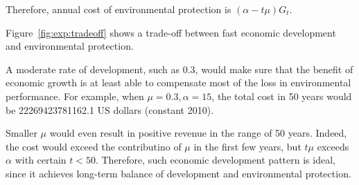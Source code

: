 Therefore, annual cost of environmental protection is $(\alpha-t\mu)G_t$.

Figure~\ref{fig:exp:tradeoff} shows a trade-off between fast economic development and environmental protection. 

A moderate rate of development, such as 0.3, would make sure that the benefit of economic growth is at least able to compensate most of the loss in environmental performance. For example, when $\mu=0.3, \alpha=15$, the total cost in 50 years would be 22269423781162.1 US dollars (constant 2010). 

Smaller $\mu$ would even result in positive revenue in the range of 50 years. Indeed, the cost would exceed the contributino of $\mu$ in the first few years, but $t\mu$ exceeds $\alpha$ with certain $t<50$. Therefore, such economic development pattern is ideal, since it achieves long-term balance of development and environmental protection.